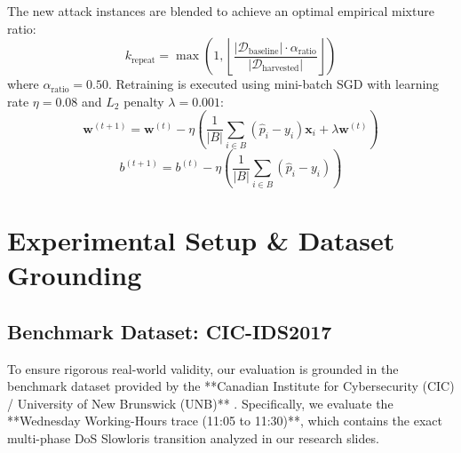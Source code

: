 \documentclass[conference]{IEEEtran}
\begin{document}
The new attack instances are blended to achieve an optimal empirical mixture ratio:
\begin{equation}
k_{\text{repeat}} = \max\left(1, \left\lfloor \frac{|\mathcal{D}_{\text{baseline}}| \cdot \alpha_{\text{ratio}}}{|\mathcal{D}_{\text{harvested}}|} \right\rfloor\right)
\end{equation}
where $\alpha_{\text{ratio}} = 0.50$. Retraining is executed using mini-batch SGD with learning rate $\eta = 0.08$ and $L_2$ penalty $\lambda = 0.001$:
\begin{equation}
\mathbf{w}^{(t+1)} = \mathbf{w}^{(t)} - \eta \left( \frac{1}{|B|} \sum_{i \in B} (\hat{p}_i - y_i) \mathbf{x}_i + \lambda \mathbf{w}^{(t)} \right)
\end{equation}
\begin{equation}
b^{(t+1)} = b^{(t)} - \eta \left( \frac{1}{|B|} \sum_{i \in B} (\hat{p}_i - y_i) \right)
\end{equation}

\section{Experimental Setup \& Dataset Grounding}

\subsection{Benchmark Dataset: CIC-IDS2017}
To ensure rigorous real-world validity, our evaluation is grounded in the benchmark dataset provided by the **Canadian Institute for Cybersecurity (CIC) / University of New Brunswick (UNB)** \cite{sharafaldin2018}. Specifically, we evaluate the **Wednesday Working-Hours trace (11:05 to 11:30)**, which contains the exact multi-phase DoS Slowloris transition analyzed in our research slides.
\end{document}
